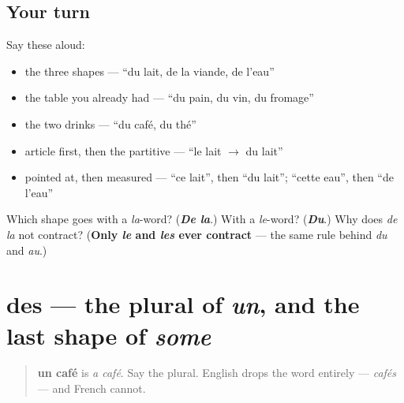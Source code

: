 \subsection*{Your turn}
Say these aloud:

\begin{itemize}
\raggedright
  \item the three shapes — \textquotedblleft{}du lait, de la viande, de l'eau\textquotedblright{}
  \item the table you already had — \textquotedblleft{}du pain, du vin, du fromage\textquotedblright{}
  \item the two drinks — \textquotedblleft{}du café, du thé\textquotedblright{}
  \item article first, then the partitive — \textquotedblleft{}le lait $\to$ du lait\textquotedblright{}
  \item pointed at, then measured — \textquotedblleft{}ce lait\textquotedblright{}, then \textquotedblleft{}du lait\textquotedblright{}; \textquotedblleft{}cette eau\textquotedblright{}, then \textquotedblleft{}de l'eau\textquotedblright{}
\end{itemize}

\begin{tcolorbox}[breakable,colback=teal!4,colframe=teal!35!black,title={Before you move on}]
Which shape goes with a \emph{la}-word? (\emph{\textbf{De la}}.) With a \emph{le}-word? (\emph{\textbf{Du}}.) Why does \emph{de la} not contract? (\textbf{Only \emph{le} and \emph{les} ever contract} — the same rule behind \emph{du} and \emph{au}.)
\end{tcolorbox}
\section[des]{des — the plural of \emph{un}, and the last shape of \emph{some}}

\label{lesson:FR-C35-des}



\begin{quote}
\textbf{un café} is \emph{a café}. Say the plural. English drops the word entirely — \emph{cafés} — and French cannot.
\end{quote}

